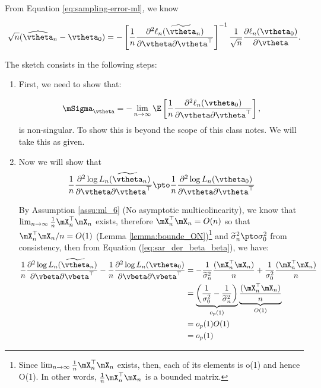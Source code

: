 \documentclass[english,12pt]{book}\usepackage[]{graphicx}\usepackage[]{xcolor}
\begin{document}
\begin{subappendices}
From Equation \eqref{eq:sampling-error-ml}, we know 

\begin{equation*}
  \sqrt{n}(\widehat{\vtheta}_n - \vtheta_0) = - \left[\frac{1}{n}\frac{\partial^2 \ell_n(\widetilde{\vtheta}_n)}{\partial \vtheta \partial \vtheta^\top}\right]^{-1}\frac{1}{\sqrt{n}}\frac{\partial \ell_n(\vtheta_0)}{\partial \vtheta}.
\end{equation*}

The sketch consists in the following steps: 
\begin{enumerate}
  \item First, we need to show that:

    \begin{equation*}
    \mSigma_{\vtheta} = - \lim_{n\to\infty} \E\left[\frac{1}{n}\frac{\partial^2 \ell_n(\vtheta_0)}{\partial \vtheta \partial \vtheta^\top}\right],
    \end{equation*}
    is non-singular. To show this is beyond the scope of this class notes. We will take this as given. 
  \item Now we will show that 
   \begin{equation*}
    \frac{1}{n}\frac{\partial^2 \log L_n(\widetilde{\vtheta}_n)}{\partial \vtheta \partial \vtheta^\top}\pto \frac{1}{n}\frac{\partial^2 \log L_n(\vtheta_0)}{\partial \vtheta \partial \vtheta^\top}
   \end{equation*}
   
   By Assumption \ref{assu:ml_6} (No asymptotic multicolinearity), we know that  $\lim_{n\to\infty}\frac{1}{n}\mX_n^\top\mX_n$ exists, therefore $\mX_n^\top\mX_n = O(n)$ so that $\mX_n^\top\mX_n/n = O(1)$ (Lemma \ref{lemma:bounde_ON})\footnote{Since $\lim_{n\to\infty}\frac{1}{n}\mX_n^\top\mX_n$ exists, then, each of its elements is o(1) and hence O(1). In other words, $\frac{1}{n}\mX_n^\top\mX_n$ is a bounded matrix.}   and $\widetilde{\sigma}^2_n\pto \sigma_0^2$ from consistency, then from Equation (\ref{eq:sar_der_beta_beta}), we have:
   \begin{equation*}
    \begin{aligned}
    \frac{1}{n}\frac{\partial^2 \log L_n(\widetilde{\vtheta}_n)}{\partial \vbeta \partial \vbeta^\top} - \frac{1}{n}\frac{\partial^2 \log L_n(\vtheta_0)}{\partial \vbeta \partial \vbeta^\top} & = - \frac{1}{\widetilde{\sigma}^2_n}\frac{(\mX^\top_n \mX_n)}{n} + \frac{1}{\sigma^2_0}\frac{(\mX^\top_n \mX_n)}{n} \\
    & = \underbrace{\left(\frac{1}{\sigma^2_0} - \frac{1}{\widetilde{\sigma}^2_n}\right)}_{o_p(1)}\underbrace{\frac{(\mX^\top_n \mX_n)}{n}}_{O(1)} \\
    & = o_p(1)O(1)  \\
    & = o_p(1)
    \end{aligned}
   \end{equation*}
   

\end{enumerate}
\end{subappendices}
\end{document}
